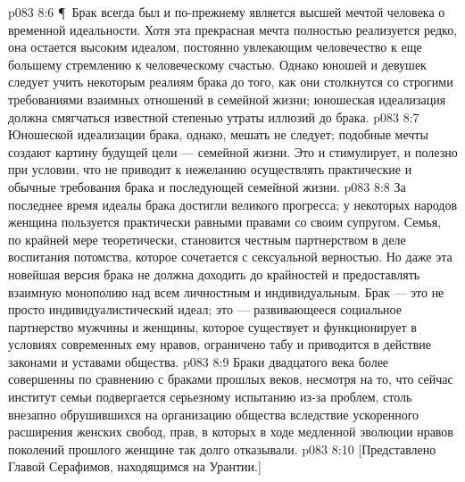 \vs p083 8:6 \P\ Брак всегда был и по\hyp{}прежнему является высшей мечтой человека о временной идеальности. Хотя эта прекрасная мечта полностью реализуется редко, она остается высоким идеалом, постоянно увлекающим человечество к еще большему стремлению к человеческому счастью. Однако юношей и девушек следует учить некоторым реалиям брака до того, как они столкнутся со строгими требованиями взаимных отношений в семейной жизни; юношеская идеализация должна смягчаться известной степенью утраты иллюзий до брака.
\vs p083 8:7 Юношеской идеализации брака, однако, мешать не следует; подобные мечты создают картину будущей цели --- семейной жизни. Это и стимулирует, и полезно при условии, что не приводит к нежеланию осуществлять практические и обычные требования брака и последующей семейной жизни.
\vs p083 8:8 За последнее время идеалы брака достигли великого прогресса; у некоторых народов женщина пользуется практически равными правами со своим супругом. Семья, по крайней мере теоретически, становится честным партнерством в деле воспитания потомства, которое сочетается с сексуальной верностью. Но даже эта новейшая версия брака не должна доходить до крайностей и предоставлять взаимную монополию над всем личностным и индивидуальным. Брак --- это не просто индивидуалистический идеал; это --- развивающееся социальное партнерство мужчины и женщины, которое существует и функционирует в условиях современных ему нравов, ограничено табу и приводится в действие законами и уставами общества.
\vs p083 8:9 Браки двадцатого века более совершенны по сравнению с браками прошлых веков, несмотря на то, что сейчас институт семьи подвергается серьезному испытанию из\hyp{}за проблем, столь внезапно обрушившихся на организацию общества вследствие ускоренного расширения женских свобод, прав, в которых в ходе медленной эволюции нравов поколений прошлого женщине так долго отказывали.
\vs p083 8:10 [Представлено Главой Серафимов, находящимся на Урантии.]
